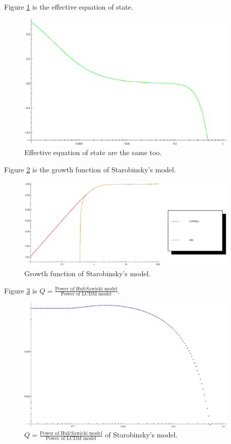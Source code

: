 \documentclass[12pt,a4paper]{article}
\begin{document}
Figure \ref{Fig-SBMod-EoSEff} is the effective equation of state.
\begin{figure}[!htpb]
\centering
\includegraphics[width=300pt]{SBMod-EoSEff.eps}
\caption{Effective equation of state are the same too.}\label{Fig-SBMod-EoSEff}
\end{figure}

Figure \ref{Fig-SBMod-Growth} is the growth function of Starobinsky's model.
\begin{figure}[!htpb]
\centering
\includegraphics[width=300pt]{SBMod-Growth.eps}
\caption{Growth function of Starobinsky's model.}\label{Fig-SBMod-Growth}
\end{figure}



Figure \ref{Fig-SBMod-QFac} is $Q=\frac{\text{Power of Hu\&Sawicki model}}{\text{Power of LCDM model}}$.
\begin{figure}[!htpb]
\centering
\includegraphics[width=300pt]{SBMod-QFac.eps}
\caption{$Q=\frac{\text{Power of Hu\&Sawicki model}}{\text{Power of LCDM model}}$ of Starobinsky's model.}\label{Fig-SBMod-QFac}
\end{figure}
\end{document}
